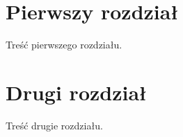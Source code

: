 \documentclass[a4paper, 12pt]{article}
\begin{document}
  

  \tableofcontents
  \section{Pierwszy rozdział}
  Treść pierwszego rozdziału.
  \section{Drugi rozdział}
  Treść drugie rozdziału.
\end{document}
